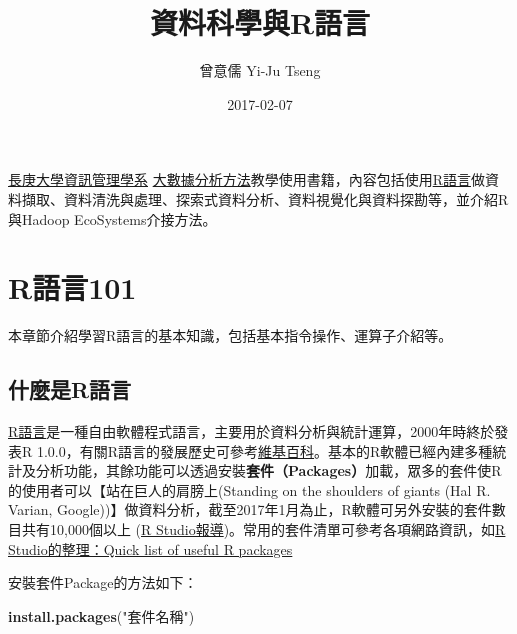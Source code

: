\documentclass[]{book}
\title{資料科學與R語言}
\author{曾意儒 Yi-Ju Tseng}
\date{2017-02-07}
\newenvironment{Shaded}{\begin{snugshade}}{\end{snugshade}}
\newcommand{\KeywordTok}[1]{\textcolor[rgb]{0.13,0.29,0.53}{\textbf{{#1}}}}
\newcommand{\StringTok}[1]{\textcolor[rgb]{0.31,0.60,0.02}{{#1}}}
\newcommand{\NormalTok}[1]{{#1}}
\theoremstyle{definition}
\theoremstyle{definition}
\theoremstyle{remark}
\begin{document}
\maketitle

{
\setcounter{tocdepth}{1}
\tableofcontents
}
\chapter*{}\label{preface}

\href{http://im.cgu.edu.tw/bin/home.php}{長庚大學資訊管理學系}
\href{https://github.com/yijutseng/BigDataCGUIM}{大數據分析方法}教學使用書籍，內容包括使用\href{http://www.r-project.org/}{R語言}做資料擷取、資料清洗與處理、探索式資料分析、資料視覺化與資料探勘等，並介紹R與Hadoop
EcoSystems介接方法。

\chapter{R語言101}\label{intro}

本章節介紹學習R語言的基本知識，包括基本指令操作、運算子介紹等。

\section{什麼是R語言}\label{r}

\href{http://www.r-project.org/}{R語言}是一種自由軟體程式語言，主要用於資料分析與統計運算，2000年時終於發表R
1.0.0，有關R語言的發展歷史可參考\href{https://zh.wikipedia.org/wiki/R\%E8\%AF\%AD\%E8\%A8\%80}{維基百科}。基本的R軟體已經內建多種統計及分析功能，其餘功能可以透過安裝\textbf{套件（Packages）}加載，眾多的套件使R的使用者可以【站在巨人的肩膀上(Standing
on the shoulders of giants (Hal R. Varian,
Google))】做資料分析，截至2017年1月為止，R軟體可另外安裝的套件數目共有10,000個以上
(\href{https://www.rstudio.com/rviews/2017/01/06/10000-cran-packages/}{R
Studio報導})。常用的套件清單可參考各項網路資訊，如\href{https://support.rstudio.com/hc/en-us/articles/201057987-Quick-list-of-useful-R-packages}{R
Studio的整理：Quick list of useful R packages}

安裝套件Package的方法如下：

\begin{Shaded}
\begin{Highlighting}[]
\KeywordTok{install.packages}\NormalTok{(}\StringTok{"套件名稱"}\NormalTok{)}
\end{Highlighting}
\end{Shaded}
\end{document}
